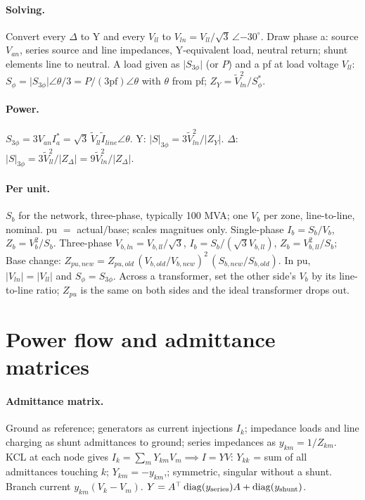 \documentclass{article}
\newcommand{\abs}[1]{\lvert#1\rvert}
\begin{document}
\paragraph{Solving.}
Convert every $\Delta$ to Y and every $V_{ll}$ to $V_{ln} = V_{ll}/\sqrt3\,\angle{-30^\circ}$.
Draw phase a: source $V_{an}$, series source and line impedances, Y-equivalent load, neutral return; shunt elements line to neutral.
A load given as $\abs{S_{3\phi}}$ (or $P$) and a pf at load voltage $V_{ll}$: $S_\phi = \abs{S_{3\phi}}\angle\theta/3 = P/(3\text{pf})\angle\theta$ with $\theta$ from pf; $Z_Y = \tilde V_{ln}^2/S_\phi^*$.

\paragraph{Power.}
$S_{3\phi} = 3V_{an}I_a^* = \sqrt3\,\tilde V_{ll}\tilde I_{line}\angle\theta$.
Y: $\abs S_{3\phi} = 3\tilde V_{ln}^2/\abs{Z_Y}$. $\Delta$: $\abs S_{3\phi} = 3\tilde V_{ll}^2/\abs{Z_\Delta} = 9\tilde V_{ln}^2/\abs{Z_\Delta}$.

\paragraph{Per unit.}
$S_b$ for the network, three-phase, typically 100 MVA; one $V_b$ per zone, line-to-line, nominal.
pu $=$ actual$/$base; scales magnitues only.
Single-phase $I_b = S_b/V_b$, $Z_b = V_b^2/S_b$.
Three-phase $V_{b,ln} = V_{b,ll}/\sqrt3$, $I_b = S_b/(\sqrt3 V_{b,ll})$, $Z_b = V_{b,ll}^2/S_b$; 
Base change: $Z_{pu,new} = Z_{pu,old}\,(V_{b,old}/V_{b,new})^2\,(S_{b,new}/S_{b,old})$.
In pu, $\abs{V_{ln}} = \abs{V_{ll}}$ and $S_\phi = S_{3\phi}$.
Across a transformer, set the other side's $V_b$ by its line-to-line ratio; $Z_{pu}$ is the same on both sides and the ideal transformer drops out.




\section{Power flow and admittance matrices}
\paragraph{Admittance matrix.}
Ground as reference; generators as current injections $I_k$; impedance loads and line charging as shunt admittances to ground; series impedances as $y_{km} = 1/Z_{km}$.
KCL at each node gives $I_k = \sum_m Y_{km}V_m\implies I = YV$: $Y_{kk}$ = sum of all admittances touching $k$; $Y_{km} = -y_{km}$,; symmetric, singular without a shunt.
Branch current $y_{km}(V_k - V_m)$.
$Y = A^\top\operatorname{diag}(y_{\rm series})A + \operatorname{diag}(y_{\rm shunt})$.
\end{document}
